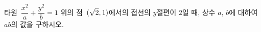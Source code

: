 타원~$\dfrac{x^2}{a}+\dfrac{y^2}{b}=1$ 위의 점~$(\sqrt{2}{,}\mkern3mu\mathopen{}1)$에서의 접선의 $y$절편이 \mbox{$2$일} 때, 상수 $a$, $b$에 대하여 $ab$의 값을 구하시오.
